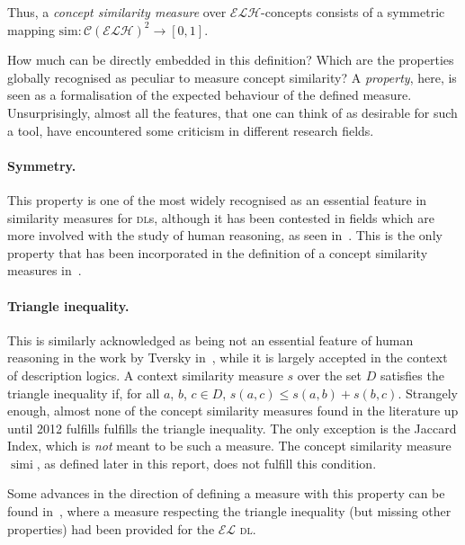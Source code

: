 \documentclass[]{llncs}
\DeclareMathOperator{\simi}{simi}
\newcommand{\el}{\(\mathcal{EL}{}\)}
\newcommand{\elh}{\(\mathcal{ELH}{}\)}
\newcommand{\dl}{\textsc{dl}}
\begin{document}
  Thus, a \emph{concept similarity measure} over \elh-concepts consists of a symmetric mapping \(\mathrm{sim} \colon {\mathcal{C}(\mathcal{ELH})}^2 \to [0,1]\).

  How much can be directly embedded in this definition?
  Which are the properties globally recognised as peculiar to measure concept similarity?
  A \emph{property}, here, is seen as a formalisation of the expected behaviour of the defined measure.
  Unsurprisingly, almost all the features, that one can think of as desirable for such a tool, have encountered some criticism in different research fields.

  \paragraph{Symmetry.} This property is one of the most widely recognised as an essential feature in similarity measures for \dl{}s, although it has been contested in fields which are more involved with the study of human reasoning, as seen in~\cite{Tve77}.
  This is the only property that has been incorporated in the definition of a concept similarity measures in~\cite{LeTu12}.

  \paragraph{Triangle inequality.} This is similarly acknowledged as being not an essential feature of human reasoning in the work by Tversky in~\cite{Tve77}, while it is largely accepted in the context of description logics.
  A context similarity measure \(s\) over the set \(D\) satisfies the triangle inequality if, for all \(a\), \(b\), \(c \in D\),
  \(s(a,c) \le s(a,b) + s(b,c)\).
  Strangely enough, almost none of the concept similarity measures found in the literature up until 2012 fulfills fulfills the triangle inequality.
  The only exception is the Jaccard Index, which is \emph{not} meant to be such a measure.
  The concept similarity measure \(\simi\), as defined later in this report, does not fulfill this condition.

  Some advances in the direction of defining a measure with this property can be found in~\cite{DAB14}, where a measure respecting the triangle inequality (but missing other properties) had been provided for the \el{} \dl.
\end{document}
